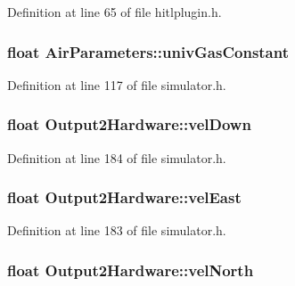 \-Definition at line 65 of file hitlplugin.\-h.

\hypertarget{group___h_i_t_l_plugin_gaf6cf658bcff6f341c341ba3f6194761c}{
\subsubsection[{univ\-Gas\-Constant}]{\setlength{\rightskip}{0pt plus 5cm}float {\bf \-Air\-Parameters\-::univ\-Gas\-Constant}}}\label{group___h_i_t_l_plugin_gaf6cf658bcff6f341c341ba3f6194761c}


\-Definition at line 117 of file simulator.\-h.

\hypertarget{group___h_i_t_l_plugin_ga9d5ac871d0c0845dcd9363069268c2d3}{
\subsubsection[{vel\-Down}]{\setlength{\rightskip}{0pt plus 5cm}float {\bf \-Output2\-Hardware\-::vel\-Down}}}\label{group___h_i_t_l_plugin_ga9d5ac871d0c0845dcd9363069268c2d3}


\-Definition at line 184 of file simulator.\-h.

\hypertarget{group___h_i_t_l_plugin_gae7889fb60f991558b83af5aef685a35f}{
\subsubsection[{vel\-East}]{\setlength{\rightskip}{0pt plus 5cm}float {\bf \-Output2\-Hardware\-::vel\-East}}}\label{group___h_i_t_l_plugin_gae7889fb60f991558b83af5aef685a35f}


\-Definition at line 183 of file simulator.\-h.

\hypertarget{group___h_i_t_l_plugin_gaa20e34957a2badaea5d07a49ab029182}{
\subsubsection[{vel\-North}]{\setlength{\rightskip}{0pt plus 5cm}float {\bf \-Output2\-Hardware\-::vel\-North}}}\label{group___h_i_t_l_plugin_gaa20e34957a2badaea5d07a49ab029182}



